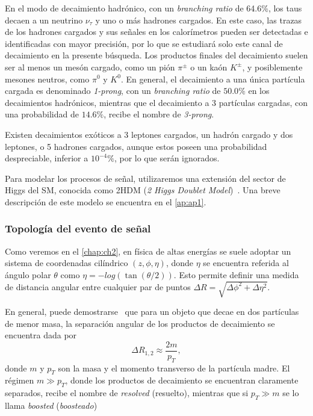 En el modo de decaimiento hadrónico, con un \textit{branching ratio} de 64.6\%, los taus decaen a un neutrino $\nu_\tau$ y uno o más hadrones cargados. En este caso, las trazas de los hadrones cargados y sus señales en los calorímetros pueden ser detectadas e identificadas con mayor precisión, por lo que se estudiará solo este canal de decaimiento en la presente búsqueda. Los productos finales del decaimiento suelen ser al menos un mesón cargado, como un pión $\pi^\pm$ o un kaón $K^\pm$, y posiblemente mesones neutros, como $\pi^0$ y $K^0$. En general, el decaimiento a una única partícula cargada es denominado \textit{1-prong}, con un \textit{branching ratio} de $50.0\%$ en los decaimientos hadrónicos, mientras que el decaimiento a 3 partículas cargadas, con una probabilidad de $14.6\%$, recibe el nombre de \textit{3-prong}.

Existen decaimientos exóticos a 3 leptones cargados, un hadrón cargado y dos leptones, o 5 hadrones cargados, aunque estos poseen una probabilidad despreciable, inferior a $10^{-4}\%$, por lo que serán ignorados.

Para modelar los procesos de señal, utilizaremos una extensión del sector de Higgs del SM, conocida como 2HDM (\textit{2 Higgs Doublet Model})~\cite{Degrande2015a,Jurciukonis2019}. Una breve descripción de este modelo se encuentra en el \cref{ap:ap1}.

\vspace{1em}
\subsubsection{Topología del evento de señal}

Como veremos en el \cref{chap:ch2}, en física de altas energías se suele adoptar un sistema de coordenadas cilíndrico $(z,\phi,\eta)$, donde $\eta$ se encuentra referida al ángulo polar $\theta$ como $\eta = -log(\tan(\theta/2))$. Esto permite definir una medida de distancia angular entre cualquier par de puntos $\Delta R = \sqrt{\Delta\phi^2 + \Delta\eta^2}$.

En general, puede demostrarse~\cite[-2em][]{Han2017} que para un objeto que decae en dos partículas de menor masa, la separación angular de los productos de decaimiento se encuentra dada por
\[ \Delta R_{1,2} \approx \frac{2m}{p_T} \label{eq:ch1:ditau:angular_sep}, \]
donde $m$ y $p_T$ son la masa y el momento transverso de la partícula madre. El régimen $m \gg p_T$, donde los productos de decaimiento se encuentran claramente separados, recibe el nombre de \textit{resolved} (resuelto), mientras que si $p_T \gg m$ se lo llama \textit{boosted} (\textit{boosteado})

